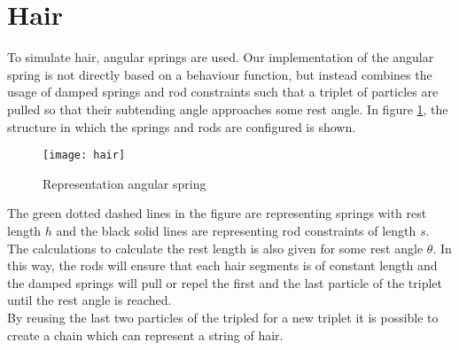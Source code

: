 \section{Hair}
To simulate hair, angular springs are used. Our implementation of the angular spring is not directly based on a behaviour function, but instead combines the usage of damped springs and rod constraints such that a triplet of particles are pulled so that their subtending angle approaches some rest angle. In figure \ref{fig:Angular Spring}, the structure in which the springs and rods are configured is shown. \\
\begin{figure}[h]
    \centering
    \texttt{[image: hair]}
    \caption{Representation angular spring}
    \label{fig:Angular Spring}
\end{figure}
The green dotted dashed lines in the figure are representing springs with rest length $h$ and the black solid lines are representing rod constraints of length $s$. The calculations to calculate the rest length is also given for some rest angle $\theta$. In this way, the rods will ensure that each hair segments is of constant length and the damped springs will pull or repel the first and the last particle of the triplet until the rest angle is reached.\\
By reusing the last two particles of the tripled for a new triplet it is possible to create a chain which can represent a string of hair. 